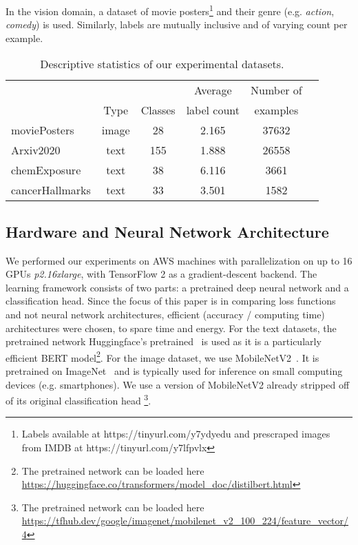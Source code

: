 In the vision domain, a dataset of movie posters\footnote{Labels available at https://tinyurl.com/y7ydyedu and prescraped images from IMDB at https://tinyurl.com/y7lfpvlx} and their genre (e.g. \emph{action}, \emph{comedy}) is used. Similarly, labels are mutually inclusive and of varying count per example. 

\begin{table}
\caption{Descriptive statistics of our experimental datasets.}
\label{tab:arxiv2020}
\centering
\begin{tabular}{l ccccc}
\toprule
& & & Average & Number of \\
& Type & Classes & label count & examples \\
\midrule
moviePosters & image & 28 & 2.165 & 37632\\
Arxiv2020 & text & 155 & 1.888 & 26558\\ 
chemExposure & text & 38 & 6.116 & 3661\\
cancerHallmarks\hspace{-.7em}  & text & 33 & 3.501 & 1582\\
\bottomrule
\end{tabular}
\end{table}

\subsection{Hardware and Neural Network Architecture}

We performed our experiments on AWS machines with parallelization on up to 16 GPUs \textit{p2.16xlarge}, with TensorFlow 2 as a gradient-descent backend. The learning framework consists of two parts: a pretrained deep neural network and a classification head. Since the focus of this paper is in comparing loss functions and not neural network architectures, efficient  (accuracy / computing time) architectures were chosen, to spare time and energy.
For the text datasets, the pretrained network Huggingface's pretrained~\cite{distilBert} is used as it is a particularly efficient BERT model\footnote{The pretrained network can be loaded here \url{https://huggingface.co/transformers/model_doc/distilbert.html}}. For the image dataset, we use MobileNetV2~\cite{mobileNet}. It is pretrained on ImageNet~\cite{imagenet} and is typically used for inference on small computing devices (e.g. smartphones). We use a version of MobileNetV2 already stripped off of its original classification head  \footnote{The pretrained network can be loaded here \url{https://tfhub.dev/google/imagenet/mobilenet_v2_100_224/feature_vector/4}}.

